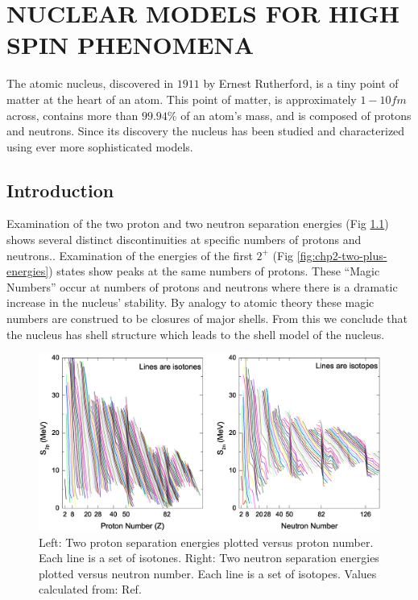 %
%

\chapter{NUCLEAR MODELS FOR HIGH SPIN PHENOMENA}
\label{chp:models}
The atomic nucleus, discovered in $1911$ by Ernest Rutherford\cite{rutherfordNuclearModel}, is a tiny point of matter at the heart of an atom. This point of matter, is approximately $1-10fm$ across, contains more than $99.94\%$ of an atom's mass, and is composed of protons and neutrons. Since its discovery the nucleus has been studied and characterized using ever more sophisticated models.

\section{Introduction}
\label{sec:models-into}

Examination of the two proton and two neutron separation energies (Fig \ref{fig:chp2-masses}) shows several distinct discontinuities at specific numbers of protons and neutrons.. Examination of the energies of the first $2^+$ (Fig \ref{fig:chp2-two-plus-energies}) states show peaks at the same numbers of protons. These ``Magic Numbers'' occur at numbers of protons and neutrons where there is a dramatic increase in the nucleus' stability. By analogy to atomic theory these magic numbers are construed to be closures of major shells. From this we conclude that the nucleus has shell structure which leads to the shell model of the nucleus.
\begin{figure}
\label{fig:chp2-masses}
\centerline{\includegraphics[height=0.3\textheight]{./img/c2/2nuc_sep_en.eps}}
	\caption{Left: Two proton separation energies plotted versus proton number. Each line is a set of isotones. Right: Two neutron separation energies plotted versus neutron number. Each line is a set of isotopes. Values calculated from: Ref.\cite{AME20031,AME20032}}
\end{figure}

